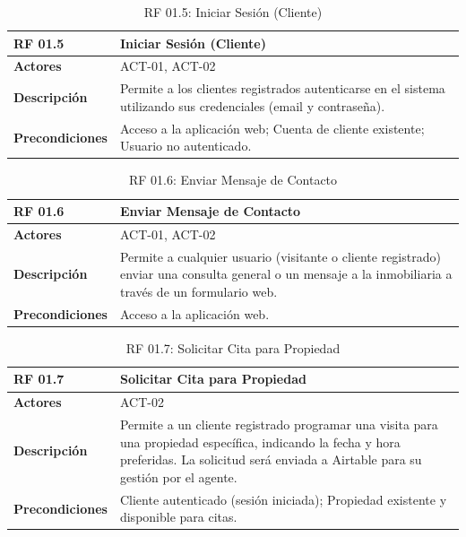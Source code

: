 \begin{table}[H]
\centering
\begin{tabular}{|p{3cm}|p{10cm}|}
\hline
\rowcolor{tealblue}
\textbf{RF 01.5} & \textbf{Iniciar Sesión (Cliente)} \\
\hline
\textbf{Actores} & ACT-01, ACT-02 \\
\hline
\textbf{Descripción} & Permite a los clientes registrados autenticarse en el sistema utilizando sus credenciales (email y contraseña). \\
\hline
\textbf{Precondiciones} & Acceso a la aplicación web; Cuenta de cliente existente; Usuario no autenticado. \\
\hline
\end{tabular}
\caption{RF 01.5: Iniciar Sesión (Cliente)}
\end{table}

\begin{table}[H]
\centering
\begin{tabular}{|p{3cm}|p{10cm}|}
\hline
\rowcolor{tealblue}
\textbf{RF 01.6} & \textbf{Enviar Mensaje de Contacto} \\
\hline
\textbf{Actores} & ACT-01, ACT-02 \\
\hline
\textbf{Descripción} & Permite a cualquier usuario (visitante o cliente registrado) enviar una consulta general o un mensaje a la inmobiliaria a través de un formulario web. \\
\hline
\textbf{Precondiciones} & Acceso a la aplicación web. \\
\hline
\end{tabular}
\caption{RF 01.6: Enviar Mensaje de Contacto}
\end{table}

\begin{table}[H]
\centering
\begin{tabular}{|p{3cm}|p{10cm}|}
\hline
\rowcolor{tealblue}
\textbf{RF 01.7} & \textbf{Solicitar Cita para Propiedad} \\
\hline
\textbf{Actores} & ACT-02 \\
\hline
\textbf{Descripción} & Permite a un cliente registrado programar una visita para una propiedad específica, indicando la fecha y hora preferidas. La solicitud será enviada a Airtable para su gestión por el agente. \\
\hline
\textbf{Precondiciones} & Cliente autenticado (sesión iniciada); Propiedad existente y disponible para citas. \\
\hline
\end{tabular}
\caption{RF 01.7: Solicitar Cita para Propiedad}
\end{table}


